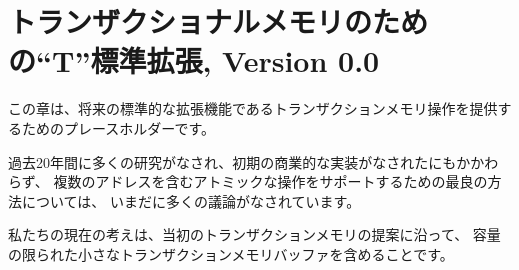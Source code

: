 \begin{comment}
\chapter{``T'' Standard Extension for Transactional Memory, Version 0.0}
\end{comment}
\chapter{トランザクショナルメモリのための``T''標準拡張, Version 0.0}
\label{sec:tm}

\begin{comment}
This chapter is a placeholder for a future standard extension to
provide transactional memory operations.
\end{comment}
この章は、将来の標準的な拡張機能であるトランザクションメモリ操作を提供するためのプレースホルダーです。

\begin{commentary}
\begin{comment}
Despite much research over the last twenty years, and initial
commercial implementations, there is still much debate on the best way
to support atomic operations involving multiple addresses.

Our current thoughts are to include a small limited-capacity
transactional memory buffer along the lines of the original
transactional memory proposals.
\end{comment}

過去20年間に多くの研究がなされ、初期の商業的な実装がなされたにもかかわらず、
複数のアドレスを含むアトミックな操作をサポートするための最良の方法については、
いまだに多くの議論がなされています。

私たちの現在の考えは、当初のトランザクションメモリの提案に沿って、
容量の限られた小さなトランザクションメモリバッファを含めることです。
\end{commentary}

